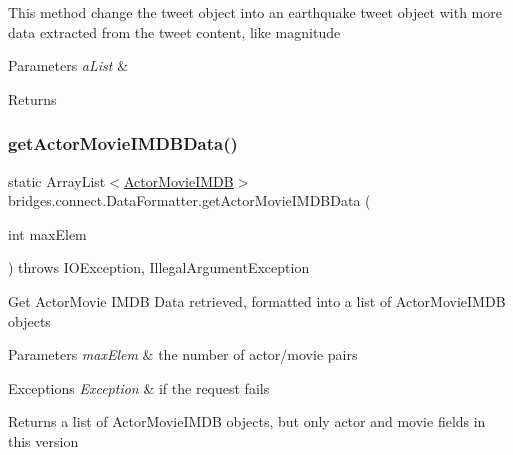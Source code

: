 This method change the tweet object into an earthquake tweet object with more data extracted from the tweet content, like magnitude 
\begin{DoxyParams}{Parameters}
{\em a\+List} & \\
\hline
\end{DoxyParams}
\begin{DoxyReturn}{Returns}

\end{DoxyReturn}
\mbox{\label{classbridges_1_1connect_1_1_data_formatter_aa2a84fe044615b2e1b166d412babac0f}} 
\subsubsection{\texorpdfstring{getActorMovieIMDBData()}{getActorMovieIMDBData()}}
{\footnotesize\ttfamily static Array\+List$<$\mbox{\hyperlink{classbridges_1_1data__src__dependent_1_1_actor_movie_i_m_d_b}{Actor\+Movie\+I\+M\+DB}}$>$ bridges.\+connect.\+Data\+Formatter.\+get\+Actor\+Movie\+I\+M\+D\+B\+Data (\begin{DoxyParamCaption}\item[{int}]{max\+Elem }\end{DoxyParamCaption}) throws I\+O\+Exception, Illegal\+Argument\+Exception\hspace{0.3cm}{\ttfamily [static]}}

Get Actor\+Movie I\+M\+DB Data retrieved, formatted into a list of Actor\+Movie\+I\+M\+DB objects


\begin{DoxyParams}{Parameters}
{\em max\+Elem} & the number of actor/movie pairs \\
\hline
\end{DoxyParams}

\begin{DoxyExceptions}{Exceptions}
{\em Exception} & if the request fails\\
\hline
\end{DoxyExceptions}
\begin{DoxyReturn}{Returns}
a list of Actor\+Movie\+I\+M\+DB objects, but only actor and movie fields in this version 
\end{DoxyReturn}
\mbox{\label{classbridges_1_1connect_1_1_data_formatter_a9b599616c4d7a502f9fab8663173db6d}} 
